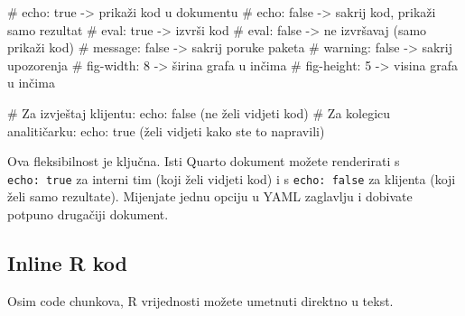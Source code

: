 \documentclass[
  croatian,
  letterpaper,
  DIV=11,
  numbers=noendperiod]{scrartcl}
\newenvironment{Shaded}{\begin{snugshade}}{\end{snugshade}}
\newcommand{\AttributeTok}[1]{\textcolor[rgb]{0.40,0.45,0.13}{#1}}
\newcommand{\CommentTok}[1]{\textcolor[rgb]{0.37,0.37,0.37}{#1}}
\newcommand{\DecValTok}[1]{\textcolor[rgb]{0.68,0.00,0.00}{#1}}
\newcommand{\FunctionTok}[1]{\textcolor[rgb]{0.28,0.35,0.67}{#1}}
\newcommand{\NormalTok}[1]{\textcolor[rgb]{0.00,0.23,0.31}{#1}}
\newcommand{\OtherTok}[1]{\textcolor[rgb]{0.00,0.23,0.31}{#1}}
\newcommand{\SpecialCharTok}[1]{\textcolor[rgb]{0.37,0.37,0.37}{#1}}
\newcommand{\StringTok}[1]{\textcolor[rgb]{0.13,0.47,0.30}{#1}}
\begin{document}
\begin{Shaded}
\begin{Highlighting}[]
\CommentTok{\# echo: true   {-}\textgreater{} prikaži kod u dokumentu}
\CommentTok{\# echo: false  {-}\textgreater{} sakrij kod, prikaži samo rezultat}
\CommentTok{\# eval: true   {-}\textgreater{} izvrši kod}
\CommentTok{\# eval: false  {-}\textgreater{} ne izvršavaj (samo prikaži kod)}
\CommentTok{\# message: false {-}\textgreater{} sakrij poruke paketa}
\CommentTok{\# warning: false {-}\textgreater{} sakrij upozorenja}
\CommentTok{\# fig{-}width: 8  {-}\textgreater{} širina grafa u inčima}
\CommentTok{\# fig{-}height: 5 {-}\textgreater{} visina grafa u inčima}

\CommentTok{\# Za izvještaj klijentu: echo: false (ne želi vidjeti kod)}
\CommentTok{\# Za kolegicu analitičarku: echo: true (želi vidjeti kako ste to napravili)}
\end{Highlighting}
\end{Shaded}

Ova fleksibilnost je ključna. Isti Quarto dokument možete renderirati s
\texttt{echo:\ true} za interni tim (koji želi vidjeti kod) i s
\texttt{echo:\ false} za klijenta (koji želi samo rezultate). Mijenjate
jednu opciju u YAML zaglavlju i dobivate potpuno drugačiji dokument.

\subsection{Inline R kod}\label{inline-r-kod}

Osim code chunkova, R vrijednosti možete umetnuti direktno u tekst.

\begin{Shaded}
\end{Shaded}
\end{document}
